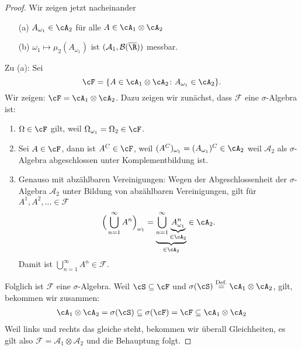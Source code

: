 \begin{proof}
Wir zeigen jetzt nacheinander
	\begin{itemize}
		\item[(a)] \label{sinnvA} $A_{\omega_1} \in \cA_2$ f\"ur alle $A \in \cA_1\otimes \cA_2$
		\item[(b)] \label{sinnvB} $\omega_1 \mapsto \mu_2(A_{\omega_1})$ ist $(\mathcal A_1,\mathcal B(\overline{\R}))$ messbar.
	\end{itemize}
	Zu (a): Sei $$\cF = \{ A \in \cA_1 \otimes \cA_2\colon A_{\omega_1} \in \cA_2 \}.$$ Wir zeigen: $\cF = \cA_1 \otimes \cA_2$. Dazu zeigen wir zun\"achst, dass $\mathcal F$ eine $\sigma$-Algebra ist:
	\begin{enumerate}[label=(\roman*)]
		\item $\Omega \in \cF$ gilt, weil $\Omega_{\omega_1} = \Omega_2 \in \cF$.
		\item Sei $A \in \cF$, dann ist $A^C \in \cF$, weil $(A^C)_{\omega_1} = (A_{\omega_1})^C \in \cA_2$ weil $\mathcal A_2$ als $\sigma$-Algebra abgeschlossen unter Komplementbildung ist.
		\item Genauso mit abzählbaren Vereinigungen: Wegen der Abgeschlossenheit der $\sigma$-Algebra $\mathcal A_2$ unter Bildung von abz\"ahlbaren Vereinigungen, gilt f\"ur $A^1, A^2, ... \in \mathcal F$
		\[ \Big(\bigcup_{n=1}^{\infty} A^n\Big)_{\omega_1} = \underbrace{\bigcup_{n=1}^{\infty} \underbrace{A_{\omega_1}^n}_{\in \cA_2}}_{\in \cA_2} \in \cA_2. \]
		Damit ist $\bigcup_{n=1}^\infty A^n\in \mathcal F$.
	\end{enumerate}
	Folglich ist $\mathcal F$ eine $\sigma$-Algebra. Weil $\cS \subseteq \cF$ und $\sigma(\cS) \overset{\text{Def.}}{=} \cA_1 \otimes \cA_2$, gilt, bekommen wir zusammen:
	\begin{align*}
		\cA_1 \otimes \cA_2 = \sigma(\cS)  \subseteq \sigma(\cF) = \cF \subseteq \cA_1 \otimes \cA_2
	\end{align*}
	Weil links und rechts das gleiche steht, bekommen wir \"uberall Gleichheiten, es gilt also $\mathcal F=\mathcal A_1\otimes \mathcal A_2$ und die Behauptung folgt.\smallskip
		

\end{proof}
